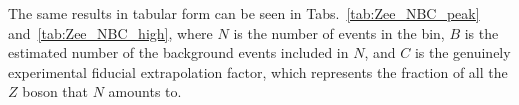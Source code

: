 \begin{figure}
\end{figure}

The same results in tabular form can be seen in Tabs.~\ref{tab:Zee_NBC_peak} and~\ref{tab:Zee_NBC_high}, where $N$ is the number of events in the bin, $B$ is the estimated number of the background events included in $N$, and $C$ is the genuinely experimental fiducial extrapolation factor, which represents the fraction of all the $Z$ boson that $N$ amounts to.

